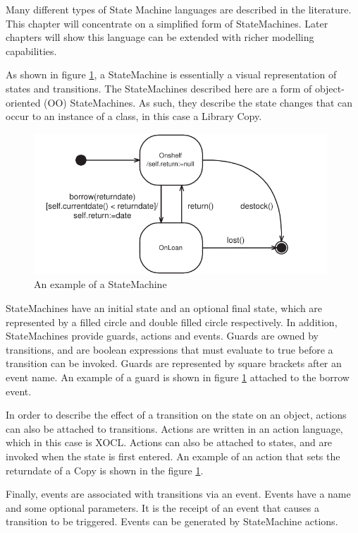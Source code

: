 Many different types of State Machine languages are described in
the literature. This chapter will concentrate on a simplified form
of StateMachines. Later chapters will show this language can be
extended with richer modelling capabilities.

As shown in figure \ref{smexample}, a StateMachine is essentially a
visual representation of states and transitions. The StateMachines
described here are a form of object-oriented (OO) StateMachines. As
such, they describe the state changes that can occur to an instance
of a class, in this case a Library Copy.

\begin{figure}[htb]
\begin{center}
\includegraphics[width=11cm]{AbstractSyntax/figures/SMExample.pdf}
\caption{An example of a StateMachine} \label{smexample}
\end{center}
\end{figure}

StateMachines have an initial state and an optional final state,
which are represented by a filled circle and double filled circle
respectively. In addition, StateMachines provide guards, actions
and events. Guards are owned by transitions, and are boolean
expressions that must evaluate to true before a transition can be
invoked. Guards are represented by square brackets after an event
name. An example of a guard is shown in figure \ref{smexample}
attached to the borrow event.

In order to describe the effect of a transition on the state on an
object, actions can also be attached to transitions. Actions are
written in an action language, which in this case is XOCL. Actions
can also be attached to states, and are invoked when the state is
first entered. An example of an action that sets the returndate of
a Copy is shown in the figure \ref{smexample}.

Finally, events are associated with transitions via an event.
Events have a name and some optional parameters. It is the receipt
of an event that causes a transition to be triggered. Events can be
generated by StateMachine actions.

